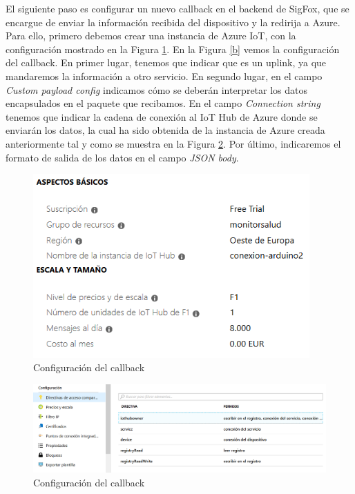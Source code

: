 \documentclass[12pt,a4paper]{article}
\begin{document}
El siguiente paso es configurar un nuevo callback en el backend de SigFox, que se encargue de enviar la información recibida del dispositivo y la redirija a Azure. Para ello, primero debemos crear una instancia de Azure IoT, con la configuración mostrado en la Figura \ref{acr}. En la Figura \ref{b} vemos la configuración del callback. En primer lugar, tenemos que indicar que es un uplink, ya que mandaremos la información a otro servicio. En segundo lugar, en el campo \textit{Custom payload config} indicamos cómo se deberán interpretar los datos encapsulados en el paquete que recibamos. En el campo \textit{Connection string} tenemos que indicar la cadena de conexión al IoT Hub de Azure donde se enviarán los datos, la cual ha sido obtenida de la instancia de Azure creada anteriormente tal y como se muestra en la Figura \ref{acl}. Por último, indicaremos el formato de salida de los datos en el campo \textit{JSON body}.


\begin{figure}[!h]
\begin{center}
\includegraphics[width=300pt]{Azurecreacion.png}
\caption{Configuración del callback}
\label{acr}
\end{center}
\end{figure}

\begin{figure}[!h]
\begin{center}
\includegraphics[width=\textwidth]{Azureclave.png}
\caption{Configuración del callback}
\label{acl}
\end{center}
\end{figure}
\end{document}
